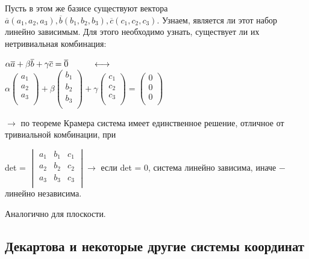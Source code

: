 Пусть в этом же базисе существуют вектора $\overline{a}(a_1, a_2, a_3), \overline{b}(b_1, b_2, b_3), \overline{c}(c_1, c_2, c_3)$. Узнаем, является ли этот набор линейно зависимым. Для этого необходимо узнать, существует ли их нетривиальная комбинация:

\begin{center}
	$\alpha\overline{a} + \beta\overline{b} + \gamma\overline{c} = \overline{0}\hspace*{1cm}\longleftrightarrow$\\
	
	$\alpha
	\begin{pmatrix*}
		a_1\\
		a_2\\
		a_3\\
	\end{pmatrix*} + \beta
	\begin{pmatrix*}
		b_1\\
		b_2\\
		b_3\\
	\end{pmatrix*} + \gamma
	\begin{pmatrix*}
		c_1\\
		c_2\\
		c_3\\
	\end{pmatrix*} = 
	\begin{pmatrix*}
		0\\
		0\\
		0\\
	\end{pmatrix*}$
\end{center} $\longrightarrow$ по теореме Крамера система имеет единственное решение, отличное от тривиальной комбинации, при
\begin{center}
	det = 
	$\begin{vmatrix}
		a_1 & b_1 & c_1\\
		a_2 & b_2 & c_2\\
		a_3 & b_3 & c_3\\
	\end{vmatrix} \longrightarrow$ если det = 0, система линейно зависима, иначе $-$ линейно независима.
	
\end{center}

Аналогично для плоскости.

\subsection{Декартова и некоторые другие системы координат}

